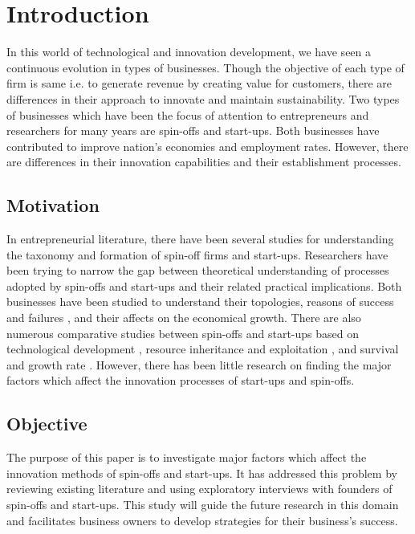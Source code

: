 \chapter{Introduction\label{cha:chapter1}}

In this world of technological and innovation development, we have seen a continuous
evolution in types of businesses. Though the objective of each type of firm is same i.e. to generate
revenue by creating value for customers, there are differences in their approach to innovate and
maintain sustainability. Two types of businesses which have been the focus of attention to
entrepreneurs and researchers for many years are spin-offs and start-ups. Both businesses have contributed to
improve nation’s economies and employment rates. However, there are differences in their
innovation capabilities and their establishment processes.


\section{Motivation\label{sec:moti}}
In entrepreneurial literature, there have been several studies for understanding the taxonomy and formation of spin-off firms and start-ups.
Researchers have been trying to narrow the gap between theoretical understanding of processes adopted by spin-offs and start-ups and their related practical implications. Both businesses have been studied to understand their topologies, reasons of success and failures \cite{fastcompany}, and their affects on
the economical growth\cite{economical_growth}. There are also numerous comparative studies between spin-offs and
start-ups based on technological development \cite{comparative_studies}, resource inheritance and exploitation \cite{resource_inheritance}, and
survival and growth rate \cite{whose_child}. However, there has been little research on finding the major factors which
affect the innovation processes of start-ups and spin-offs.

\section{Objective\label{sec:objective}}
The purpose of this paper is to investigate major factors which affect the innovation methods of
spin-offs and start-ups. It has addressed this problem by reviewing existing literature and using
exploratory interviews with founders of spin-offs and start-ups. This study will guide the future research in this domain and facilitates business owners to
develop strategies for their business's success.


